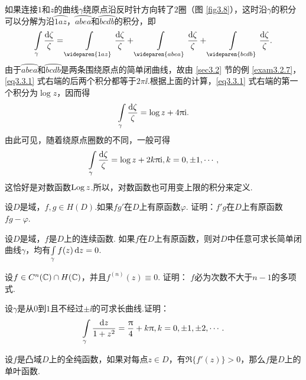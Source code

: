 \noindent 如果连接$1$和$z$的曲线$\gamma$绕原点沿反时针方向转了$2$圈（图 \ref{fig3.8}），这时沿$\gamma$的积分可以分解为沿$\wideparen{1az}$，$\wideparen{abea}$和$\wideparen{bcdb}$的积分，即
\begin{equation}\label{eq3.3.1}
  \int\limits_\gamma\frac{\dif \zeta}{\zeta}
  = \int\limits_{\wideparen{1az}}\frac{\dif \zeta}{\zeta} + \int\limits_{\wideparen{abea}}\frac{\dif \zeta}{\zeta}+\int\limits_{\wideparen{bcdb}}\frac{\dif \zeta}{\zeta}.
\end{equation}
由于$\wideparen{abea}$和$\wideparen{bcdb}$是两条围绕原点的简单闭曲线，故由 \ref{sec3.2} 节的例 \ref{exam3.2.7}，\eqref{eq3.3.1} 式右端的后两个积分都等于$2\pi\ii$.根据上面的计算，\eqref{eq3.3.1} 式右端的第一个积分为$\log z$，因而得
\[
  \int\limits_\gamma \frac{\mathop{}\!\mathrm{d} \zeta}\zeta = \log z + 4\uppi\mathrm i.
\]
由此可见，随着绕原点圈数的不同，一般可得
\[
  \int\limits_\gamma\frac{\mathop{}\!\mathrm{d} \zeta}\zeta = \log z+2k\uppi\mathrm i,k = 0,\pm1,\cdots,
\]
这恰好是对数函数$\operatorname{Log} z$.所以，对数函数也可用变上限的积分来定义.

\begin{xiti}
  \item 设$D$是域，$f,g\in H(D)$.如果$fg'$在$D$上有原函数$\varphi$. 证明：$f'g$在$D$上有原函数$fg-\varphi$.
  \item 设$D$是域，$f$是$D$上的连续函数. 如果$f$在$D$上有原函数，则对$D$中任意可求长简单闭曲线$\gamma$，均有$\int\limits_\gamma f(z)\mathop{}\!\mathrm dz=0$.
  \item 设$f\in C^n(\mathbb C)\cap H(\mathbb C)$，并且$f^{(n)}(z)\equiv0$. 证明： $f$必为次数不大于$n-1$的多项式.
  \item 设$\gamma$是从$0$到$1$且不经过$\pm\ii$的可求长曲线.证明：
    \[
      \int\limits_\gamma\frac{\mathop{}\!\mathrm dz}{1+z^2} = \frac{\uppi}4 + k\uppi,k = 0,\pm1,\pm2,\cdots.
    \]
  \item 设$f$是凸域$D$上的全纯函数，如果对每点$z\in D$，有$\Re \{f'(z)\}>0$，那么$f$是$D$上的单叶函数.
\end{xiti}

